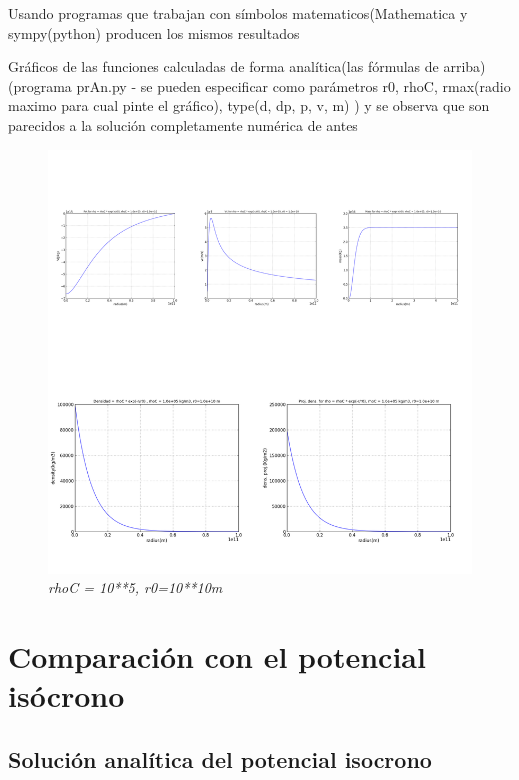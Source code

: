 \documentclass[12pt]{book}
\begin{document}
\begin{description}
\item Usando programas que trabajan con símbolos matematicos(Mathematica y sympy(python) producen los mismos resultados 



\item Gráficos de las funciones calculadas de forma analítica(las fórmulas de arriba) (programa prAn.py - se pueden especificar como parámetros r0, rhoC, rmax(radio maximo para cual pinte el gráfico), type(d, dp, p, v, m) ) 
y se observa que son parecidos a la solución completamente numérica de antes

\begin{figure}[!ht]
 \centering
 \includegraphics[scale=0.42]{allAn1.png}
 \caption{\emph{rhoC = 10**5, r0=10**10m}}
\end{figure}

\end{description}



\section*{Comparación con el potencial isócrono}


\subsection*{Solución analítica del potencial isocrono}
\end{document}
